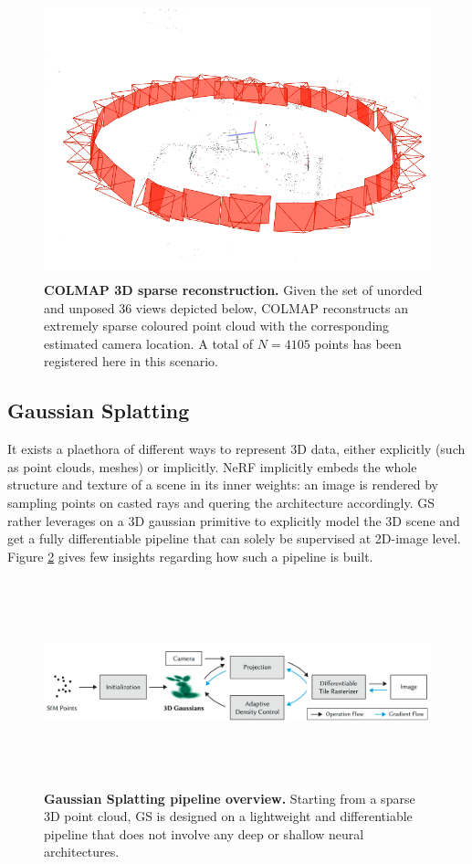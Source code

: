 \begin{figure}[htb!]
    \center
  \includegraphics[height=8cm]{images/gaussiansplatting/colmap_sparsePC.png}
  \caption{\textbf{COLMAP 3D sparse reconstruction.} Given the set of unorded and unposed 36 views depicted below, COLMAP reconstructs an extremely sparse coloured point cloud with the corresponding estimated camera location. A total of $N=4105$ points has been registered here in this scenario.}
  \label{fig:gs-sfm}
\end{figure}

\subsection{Gaussian Splatting}
\label{subsec:gs-sfm}

It exists a plaethora of different ways to represent 3D data, either explicitly (such as point clouds, meshes) or implicitly. \ac{NeRF} implicitly embeds the whole structure and texture of a scene in its inner weights: an image is rendered by sampling points on casted rays and quering the architecture accordingly. \ac{GS} rather leverages on a 3D gaussian primitive to explicitly model the 3D scene and get a fully differentiable pipeline that can solely be supervised at 2D-image level. Figure \ref{fig:gs-overview} gives few insights regarding how such a pipeline is built.  


\begin{figure}[htb!]
    \center
  \includegraphics[height=6cm]{images/gaussiansplatting/overview-pipelineGS.png}
  \caption{\textbf{Gaussian Splatting pipeline overview.} Starting from a sparse 3D point cloud, \ac{GS} is designed on a lightweight and differentiable pipeline that does not involve any deep or shallow neural architectures.}
  \label{fig:gs-overview}
\end{figure}


